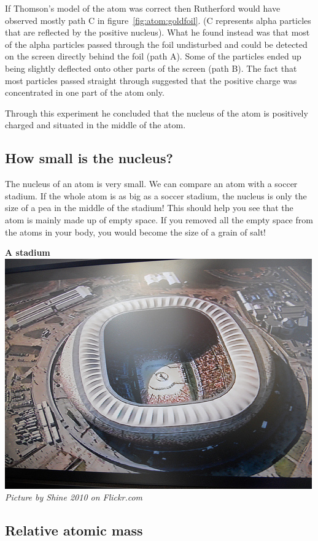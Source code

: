 If Thomson's model of the atom was correct then Rutherford would have observed mostly path C in figure~\ref{fig:atom:goldfoil}. (C represents alpha particles that are reflected by the positive nucleus). What he found instead was that most of the alpha particles passed through the foil undisturbed and could be detected on the screen directly behind the foil (path A). Some of the particles ended up being slightly deflected onto other parts of the screen (path B).  The fact that most particles passed straight through suggested that the positive charge was concentrated in one part of the atom only.\par 
Through this experiment he concluded that the nucleus of the atom is positively charged and situated in the middle of the atom.
\subsection*{How small is the nucleus?}
\begin{minipage}{.5\textwidth}
The nucleus of an atom is very small. We can compare an atom with a soccer stadium. If the whole atom is as big as a soccer stadium, the nucleus is only the size of a pea in the middle of the stadium! This should help you see that the atom is mainly made up of empty space. If you removed all the empty space from the atoms in your body, you would become the size of a grain of salt!
\end{minipage}
\begin{minipage}{.5\textwidth}
\begin{center}
\textbf{A stadium}\\
 \includegraphics[width=.4\textwidth]{photos/stadiumby-shine2010-flickr.jpg}\\
\textit{Picture by Shine 2010 on Flickr.com}
\end{center}
\end{minipage}
      \label{m38756*eip-491}
            \subsection*{Relative atomic mass}
            \nopagebreak

